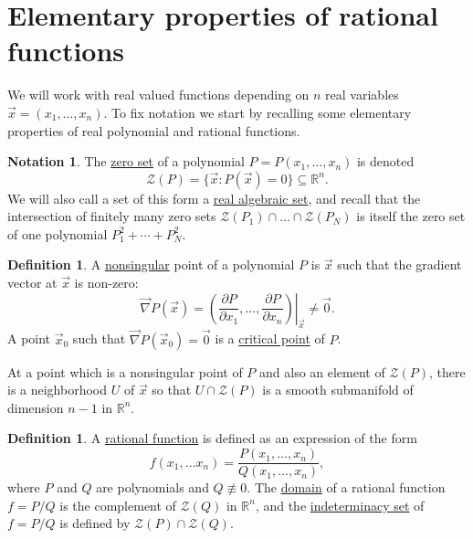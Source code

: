 \documentclass[12pt]{amsart}
\theoremstyle{definition}
\newtheorem{defn}[thm]{Definition}
\newtheorem{notation}[thm]{Notation}
\theoremstyle{remark}
\numberwithin{equation}{section}
\newcommand{\re}{\mathbb{R}}
\newcommand{\vv}{\mathcal{Z}}
\begin{document}
\section{Elementary properties of rational functions}\label{rf}

We will work with real valued functions depending on $n$ real variables  $\vec x=(x_1,\ldots,x_n)$.  To fix notation we start by recalling some elementary properties of real polynomial and rational functions.

\begin{notation}\label{not1.2}
  The {\underline{zero set}} of a polynomial $P=P(x_1,\ldots,x_n)$ is denoted $$\vv(P)=\{\vec x:P(\vec x)=0\}\subseteq\re^n.$$ 
  We will also call a set of this form a {\underline{real algebraic set}}, and recall that the intersection of finitely many zero sets $\vv(P_1)\cap\ldots\cap\vv(P_N)$ is itself the zero set of one polynomial $P_1^2+\cdots+P_N^2$. 
\end{notation}
\begin{defn}\label{def1.2}
A {\underline{nonsingular}} point of a polynomial $P$ is $\vec x$ such that the gradient vector at $\vec x$ is non-zero: $$\vec\nabla P(\vec x)=\left.\left(\frac{\partial P}{\partial x_1},\ldots,\frac{\partial P}{\partial x_n}\right)\right|_{\vec x}\ne\vec0.$$
A point $\vec x_0$ such that $\vec\nabla P(\vec x_0)=\vec0$ is a {\underline{critical point}} of $P$.
\end{defn}  
At a point which is a nonsingular point of $P$  and also an element of $\vv(P)$, there is a neighborhood $U$ of $\vec x$ so that $U\cap\vv(P)$ is a smooth submanifold of dimension $n-1$ in $\re^n$. 
\begin{defn}\label{def1.3}
  A {\underline{rational function}} is defined as an expression of the form $$f(x_1,\ldots x_n)=\frac{P(x_1,\ldots,x_n)}{Q(x_1,\ldots,x_n)},$$
  where $P$ and $Q$ are polynomials and $Q\not\equiv0$.
  The {\underline{domain}} of a rational function $f=P/Q$ is the complement of $\vv(Q)$ in $\re^n$, and the {\underline{indeterminacy set}} of $f=P/Q$  is defined by $\vv(P)\cap\vv(Q)$.
\end{defn}
\end{document}
